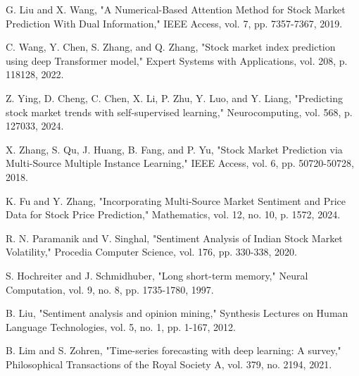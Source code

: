 \documentclass[conference]{IEEEtran}
\begin{document}
\begin{thebibliography}{00}
 G. Liu and X. Wang, "A Numerical-Based Attention Method for Stock Market Prediction With Dual Information," IEEE Access, vol. 7, pp. 7357-7367, 2019.

 C. Wang, Y. Chen, S. Zhang, and Q. Zhang, "Stock market index prediction using deep Transformer model," Expert Systems with Applications, vol. 208, p. 118128, 2022.

 Z. Ying, D. Cheng, C. Chen, X. Li, P. Zhu, Y. Luo, and Y. Liang, "Predicting stock market trends with self-supervised learning," Neurocomputing, vol. 568, p. 127033, 2024.

 X. Zhang, S. Qu, J. Huang, B. Fang, and P. Yu, "Stock Market Prediction via Multi-Source Multiple Instance Learning," IEEE Access, vol. 6, pp. 50720-50728, 2018.

 K. Fu and Y. Zhang, "Incorporating Multi-Source Market Sentiment and Price Data for Stock Price Prediction," Mathematics, vol. 12, no. 10, p. 1572, 2024.

 R. N. Paramanik and V. Singhal, "Sentiment Analysis of Indian Stock Market Volatility," Procedia Computer Science, vol. 176, pp. 330-338, 2020.

 S. Hochreiter and J. Schmidhuber, "Long short-term memory," Neural Computation, vol. 9, no. 8, pp. 1735-1780, 1997.

 B. Liu, "Sentiment analysis and opinion mining," Synthesis Lectures on Human Language Technologies, vol. 5, no. 1, pp. 1-167, 2012.

 B. Lim and S. Zohren, "Time-series forecasting with deep learning: A survey," Philosophical Transactions of the Royal Society A, vol. 379, no. 2194, 2021.
\end{thebibliography}
\end{document}
